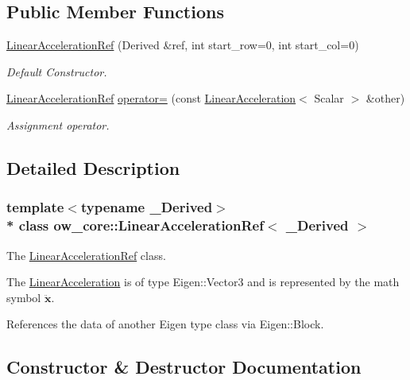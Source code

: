 \subsection*{Public Member Functions}
\begin{DoxyCompactItemize}
\item 
\hyperlink{classow__core_1_1LinearAccelerationRef_a327b5ccf2aeba7cb8b7834da592ab195}{Linear\+Acceleration\+Ref} (Derived \&ref, int start\+\_\+row=0, int start\+\_\+col=0)
\begin{DoxyCompactList}\small\item\em Default Constructor. \end{DoxyCompactList}\item 
\hyperlink{classow__core_1_1LinearAccelerationRef}{Linear\+Acceleration\+Ref} \hyperlink{classow__core_1_1LinearAccelerationRef_ad751088750f1a1bda60d43a7d09f41ea}{operator=} (const \hyperlink{classow__core_1_1LinearAcceleration}{Linear\+Acceleration}$<$ Scalar $>$ \&other)\hypertarget{classow__core_1_1LinearAccelerationRef_ad751088750f1a1bda60d43a7d09f41ea}{}\label{classow__core_1_1LinearAccelerationRef_ad751088750f1a1bda60d43a7d09f41ea}

\begin{DoxyCompactList}\small\item\em Assignment operator. \end{DoxyCompactList}\end{DoxyCompactItemize}


\subsection{Detailed Description}
\subsubsection*{template$<$typename \+\_\+\+Derived$>$\\*
class ow\+\_\+core\+::\+Linear\+Acceleration\+Ref$<$ \+\_\+\+Derived $>$}

The \hyperlink{classow__core_1_1LinearAccelerationRef}{Linear\+Acceleration\+Ref} class. 

The \hyperlink{classow__core_1_1LinearAcceleration}{Linear\+Acceleration} is of type Eigen\+::\+Vector3 and is represented by the math symbol $\ddot{\mathbf{x}}$.

References the data of another Eigen type class via Eigen\+::\+Block. 

\subsection{Constructor \& Destructor Documentation}
